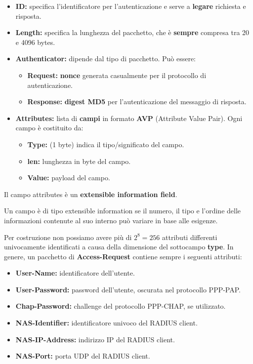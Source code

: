 \begin{itemize}
    \item \textbf{ID:} specifica l'identificatore per l'autenticazione e serve a \textbf{legare} richiesta e risposta.
    \item \textbf{Length:} specifica la lunghezza del pacchetto, che è \textbf{sempre} compresa tra 20 e 4096 bytes.
    \item \textbf{Authenticator:} dipende dal tipo di pacchetto. Può essere:
    \begin{itemize}
        \item \textbf{Request:} \textbf{nonce} generata casualmente per il protocollo di autenticazione.
        \item \textbf{Response:} \textbf{digest MD5} per l'autenticazione del messaggio di risposta.
    \end{itemize}
    \item \textbf{Attributes:} lista di \textbf{campi} in formato \textbf{AVP} (Attribute Value Pair). Ogni campo è costituito da:
    \begin{itemize}
        \item \textbf{Type:} (1 byte) indica il tipo/significato del campo.
        \item \textbf{len:} lunghezza in byte del campo.
        \item \textbf{Value:} payload del campo.
    \end{itemize}
\end{itemize}
\begin{note}
Il campo attributes è un \textbf{extensible information field}.
\end{note}
\begin{definition}
Un campo è di tipo extensible information se il numero, il tipo e l'ordine delle informazioni contenute al suo interno può variare in base alle esigenze.
\end{definition}
\begin{remark}
Per costruzione non possiamo avere più di $2^8=256$ attributi differenti univocamente identificati a causa della dimensione del sottocampo \textbf{type}. In genere, un pacchetto di \textbf{Access-Request} contiene sempre i seguenti attributi:
\begin{itemize}
    \item \textbf{User-Name:} identificatore dell'utente.
    \item \textbf{User-Password:} password dell'utente, oscurata nel protocollo PPP-PAP.
    \item \textbf{Chap-Password:} challenge del protocollo PPP-CHAP, se utilizzato.
    \item \textbf{NAS-Identifier:} identificatore univoco del RADIUS client.
    \item \textbf{NAS-IP-Address:} indirizzo IP del RADIUS client.
    \item \textbf{NAS-Port:} porta UDP del RADIUS client.
\end{itemize}
\end{remark}

